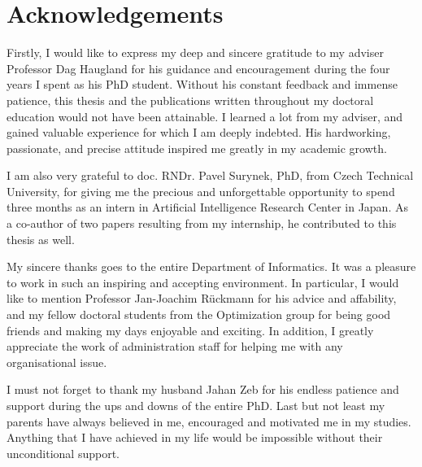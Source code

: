 \chapter{Acknowledgements}

Firstly, I would like to express my deep and sincere gratitude to my adviser Professor Dag Haugland for his guidance and encouragement during the four years I spent as his PhD student.
Without his constant feedback and immense patience, this thesis and the publications written throughout my doctoral education would not have been attainable.
I learned a lot from my adviser, and gained valuable experience for which I am deeply indebted.
His hardworking, passionate, and precise attitude inspired me greatly in my academic growth.

I am also very grateful to doc. RNDr. Pavel Surynek, PhD, from Czech Technical University, 
for giving me the precious and unforgettable opportunity to spend three months as an intern in Artificial Intelligence Research Center in Japan.
As a co-author of two papers resulting from my internship, he contributed to this thesis as well. 

My sincere thanks goes to the entire Department of Informatics.
It was a pleasure to work in such an inspiring and accepting environment. 
In particular, I would like to mention Professor Jan-Joachim R\"uckmann for his advice and affability, 
and my fellow doctoral students from the Optimization group for being good friends and making my days enjoyable and exciting.
In addition, I greatly appreciate the work of administration staff for helping me with any organisational issue.

I must not forget to thank my husband Jahan Zeb for his endless patience and support during the ups and downs of the entire PhD.
Last but not least my parents have always believed in me, encouraged and motivated me in my studies. 
Anything that I have achieved in my life would be impossible without their unconditional support. 

